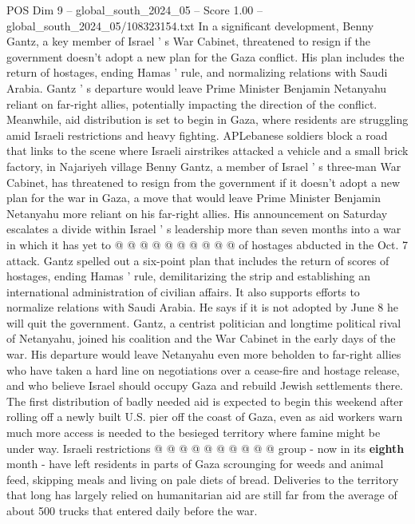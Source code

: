\begin{textsample}{POS Dim 9 – global\_south\_2024\_05 – Score 1.00 – global\_south\_2024\_05/108323154.txt}  \label{ex:f9_pos_128}
In a significant development, Benny Gantz, a key member of Israel ' s War Cabinet, threatened to resign if the government doesn't adopt a new plan for the Gaza conflict.
His plan includes the return of hostages, ending Hamas ' rule, and normalizing relations with Saudi Arabia.
Gantz ' s departure would leave Prime Minister Benjamin Netanyahu reliant on far-right allies, potentially impacting the direction of the conflict.
Meanwhile, aid distribution is set to begin in Gaza, where residents are struggling amid Israeli restrictions and heavy fighting.
APLebanese soldiers block a road that links to the scene where Israeli airstrikes attacked a vehicle and a small brick factory, in Najariyeh village Benny Gantz, a member of Israel ' s three-man War Cabinet, has threatened to resign from the government if it doesn't adopt a new plan for the war in Gaza, a move that would leave Prime Minister Benjamin Netanyahu more reliant on his far-right allies.
His announcement on Saturday escalates a divide within Israel ' s leadership more than seven months into a war in which it has yet to @ @ @ @ @ @ @ @ @ @ of hostages abducted in the Oct. 7 attack.
Gantz spelled out a six-point plan that includes the return of scores of hostages, ending Hamas ' rule, demilitarizing the strip and establishing an international administration of civilian affairs.
It also supports efforts to normalize relations with Saudi Arabia.
He says if it is not adopted by June 8 he will quit the government.
Gantz, a centrist politician and longtime political rival of Netanyahu, joined his coalition and the War Cabinet in the early days of the war.
His departure would leave Netanyahu even more beholden to far-right allies who have taken a hard line on negotiations over a cease-fire and hostage release, and who believe Israel should occupy Gaza and rebuild Jewish settlements there.
The first distribution of badly needed aid is expected to begin this weekend after rolling off a newly built U.S. pier off the coast of Gaza, even as aid workers warn much more access is needed to the besieged territory where famine might be under way.
Israeli restrictions @ @ @ @ @ @ @ @ @ @ group - now in its \textbf{eighth} month - have left residents in parts of Gaza scrounging for weeds and animal feed, skipping meals and living on pale diets of bread.
Deliveries to the territory that long has largely relied on humanitarian aid are still far from the average of about 500 trucks that entered daily before the war.

\end{textsample}
